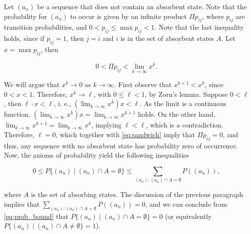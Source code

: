 \documentclass[a4paper,preprint]{elsarticle}
\begin{document}
\medskip
Let $(a_n)$ be a sequence that does not contain an absorbent state. Note that the probability for $(a_n)$ to occur is given by an infinite product $\Pi p_ {ij}$, where $p_ {ij}$ are transition probabilities, and 
$0<p_ {ij}\leq \max p_ {ij}<1$. Note that the last inequality holds, since if $p_ {ij}=1$, then $j=i$ and $i$ is in the set of absorbent states $A$. Let $x=\max p_ {ij}$, then 

\begin{equation}
\label{eq:sandwich}
 0<\Pi p_ {ij} <\lim_{k \rightarrow \infty} x^{k}.   
\end{equation}


We will argue that $x^k \rightarrow 0$ as $k \rightarrow \infty$. First observe that $x^{k+1}<x^k$, since $0<x<1$. Therefore, $x^k \rightarrow \ell$, with $0 \leq \ell <1$, by Zorn's lemma. Suppose $0 < \ell$, then $\ell \cdot x < \ell$, i. e., $(\lim_{k \rightarrow \infty} x^k)x<\ell$. As the limit is a continuous function, $(\lim_{k \rightarrow \infty} x^k)x=\lim_{k \rightarrow \infty} x^{k+1}$ holds. On the other hand, $\lim_{k \rightarrow \infty} x^{k+1}=\lim_{k \rightarrow \infty} x^{k}$, implying $\ell < \ell$, which is a contradiction. Therefore, $\ell=0$, which together with \eqref{eq:sandwich} imply that $\Pi p_ {ij}=0$, and thus, any sequence with no absorbent state has probability zero of occurrence. Now, the axioms of probability yield the following inequalities 

\begin{equation}
\label{eq:prob_bound}
 0\leq P\{(a_n) \mid (a_n) \cap A=\emptyset \}\leq \sum_{(a_n):(a_n) \cap A=\emptyset} P((a_n)),   
\end{equation}


\noindent
where $A$ is the set of absorbing states. The discussion of the previous paragraph implies that $\sum_{(a_n):(a_n) \cap A=\emptyset} P((a_n))=0$, and we can conclude from \eqref{eq:prob_bound} that $P\{(a_n) \mid (a_n) \cap A=\emptyset \}=0$ (or equivalently $P\{(a_n) \mid (a_n) \cap A \neq \emptyset \}=1$). 
\end{document}
